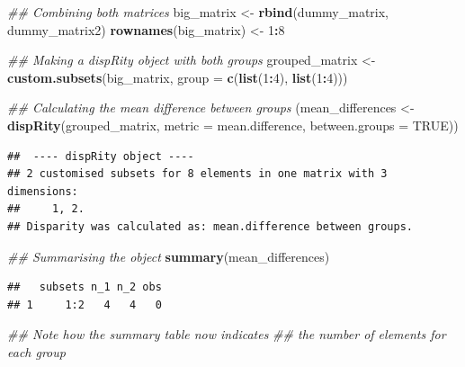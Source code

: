 \documentclass[
]{book}
\newenvironment{Shaded}{\begin{snugshade}}{\end{snugshade}}
\newcommand{\CommentTok}[1]{\textcolor[rgb]{0.56,0.35,0.01}{\textit{#1}}}
\newcommand{\DataTypeTok}[1]{\textcolor[rgb]{0.13,0.29,0.53}{#1}}
\newcommand{\DecValTok}[1]{\textcolor[rgb]{0.00,0.00,0.81}{#1}}
\newcommand{\KeywordTok}[1]{\textcolor[rgb]{0.13,0.29,0.53}{\textbf{#1}}}
\newcommand{\NormalTok}[1]{#1}
\newcommand{\OperatorTok}[1]{\textcolor[rgb]{0.81,0.36,0.00}{\textbf{#1}}}
\newcommand{\OtherTok}[1]{\textcolor[rgb]{0.56,0.35,0.01}{#1}}
\newcommand{\StringTok}[1]{\textcolor[rgb]{0.31,0.60,0.02}{#1}}
\begin{document}
\begin{Shaded}
\begin{Highlighting}[]
\CommentTok{\#\# Combining both matrices}
\NormalTok{big\_matrix \textless{}{-}}\StringTok{ }\KeywordTok{rbind}\NormalTok{(dummy\_matrix, dummy\_matrix2)}
\KeywordTok{rownames}\NormalTok{(big\_matrix) \textless{}{-}}\StringTok{ }\DecValTok{1}\OperatorTok{:}\DecValTok{8}

\CommentTok{\#\# Making a dispRity object with both groups}
\NormalTok{grouped\_matrix \textless{}{-}}\StringTok{ }\KeywordTok{custom.subsets}\NormalTok{(big\_matrix,}
                                 \DataTypeTok{group =} \KeywordTok{c}\NormalTok{(}\KeywordTok{list}\NormalTok{(}\DecValTok{1}\OperatorTok{:}\DecValTok{4}\NormalTok{), }\KeywordTok{list}\NormalTok{(}\DecValTok{1}\OperatorTok{:}\DecValTok{4}\NormalTok{)))}

\CommentTok{\#\# Calculating the mean difference between groups}
\NormalTok{(mean\_differences \textless{}{-}}\StringTok{ }\KeywordTok{dispRity}\NormalTok{(grouped\_matrix,}
                              \DataTypeTok{metric =}\NormalTok{ mean.difference,}
                              \DataTypeTok{between.groups =} \OtherTok{TRUE}\NormalTok{))}
\end{Highlighting}
\end{Shaded}

\begin{verbatim}
##  ---- dispRity object ---- 
## 2 customised subsets for 8 elements in one matrix with 3 dimensions:
##     1, 2.
## Disparity was calculated as: mean.difference between groups.
\end{verbatim}

\begin{Shaded}
\begin{Highlighting}[]
\CommentTok{\#\# Summarising the object}
\KeywordTok{summary}\NormalTok{(mean\_differences)}
\end{Highlighting}
\end{Shaded}

\begin{verbatim}
##   subsets n_1 n_2 obs
## 1     1:2   4   4   0
\end{verbatim}

\begin{Shaded}
\begin{Highlighting}[]
\CommentTok{\#\# Note how the summary table now indicates}
\CommentTok{\#\# the number of elements for each group}
\end{Highlighting}
\end{Shaded}
\end{document}
